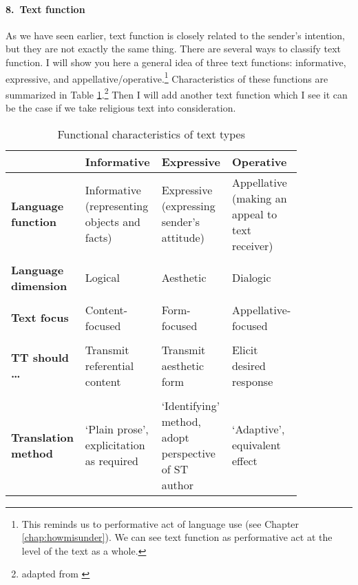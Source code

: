 \paragraph*{8.\ Text function} As we have seen earlier, text function is closely related to the sender's intention, but they are not exactly the same thing. There are several ways to classify text function. I will show you here a general idea of three text functions: informative, expressive, and appellative/operative.\footnote{This reminds us to performative act of language use (see Chapter \ref{chap:howmisunder}). We can see text function as performative act at the level of the text as a whole.} Characteristics of these functions are summarized in Table \ref{tab:texttypes}.\footnote{adapted from \citealp[p.~115]{munday:translation}} Then I will add another text function which I see it can be the case if we take religious text into consideration.

\begin{table}[!hbt]
\centering
\caption{Functional characteristics of text types}
\label{tab:texttypes}
\bigskip
\footnotesize
\begin{tabular}{@{}%
	>{\raggedright\arraybackslash\bfseries}p{0.18\linewidth}%
	>{\raggedright\arraybackslash}p{0.22\linewidth}%
	>{\raggedright\arraybackslash}p{0.22\linewidth}%
	>{\raggedright\arraybackslash}p{0.22\linewidth}@{}%
} \toprule
& \bfseries Informative & \bfseries Expressive & \bfseries Operative \\
\midrule
Language function & Informative (representing objects and facts) & Expressive (expressing sender's attitude) & Appellative (making an appeal to text receiver) \\
& & & \\
Language dimension & Logical & Aesthetic & Dialogic \\
& & & \\
Text focus & Content-focused & Form-focused & Appellative-focused \\
& & & \\
TT should \ldots & Transmit referential content & Transmit aesthetic form & Elicit desired response \\
& & & \\
Translation method & `Plain prose', explicitation as required & `Identifying' method, adopt perspective of ST author & `Adaptive', equivalent effect \\
\bottomrule
\end{tabular}
\end{table}

